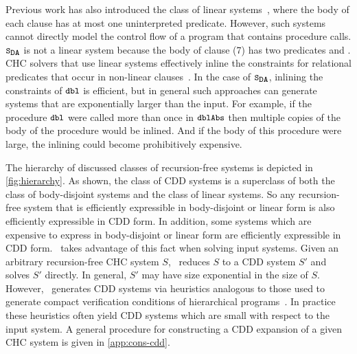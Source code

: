 Previous work has also introduced the class of linear
systems~\cite{albarghouthi12a}, where the body of each clause has at
most one uninterpreted predicate.
%
However, such systems cannot directly model the control flow of a
program that contains procedure calls.
%
$\mcchc$ is not a linear system because the body of clause (7) has two
predicates  and .
%
CHC solvers that use linear systems effectively inline the
constraints for relational predicates that occur in non-linear
clauses~\cite{albarghouthi12b}.
%
In the case of $\mcchc$, inlining the constraints of $\cc{dbl}$ is
efficient, but in general such approaches can generate systems that
are exponentially larger than the input. For example, if the procedure
$\cc{dbl}$ were called more than once in $\cc{dblAbs}$ then multiple
copies of the body of the procedure would be inlined. And if the body
of this procedure were large, the inlining could become
prohibitively expensive.

\begin{figure}[t]
  \centering
  \begin{floatrow}[2]
      {}
      {}
  \end{floatrow}
\end{figure}

The hierarchy of discussed classes of recursion-free systems is
depicted in \autoref{fig:hierarchy}.
%
As shown, the class of CDD systems is a superclass of both the class
of body-disjoint systems and the class of linear systems. So any
recursion-free system that is efficiently expressible in body-disjoint
or linear form is also efficiently expressible in CDD form.
%
In addition, some systems which are expensive to express in
body-disjoint or linear form are efficiently expressible in CDD form.
%
\sys~takes advantage of this fact when solving input systems.
Given an arbitrary recursion-free CHC system $S$, \sys~reduces $S$ to
a CDD system $S'$ and solves $S'$ directly.
%
In general, $S'$ may have size exponential in the size of
$S$.
%
However, \sys~generates CDD systems via heuristics analogous to
those used to generate compact verification conditions of hierarchical
programs~\cite{flanagan01,lal-qadeer15}.
%
In practice these heuristics often yield CDD systems which are
small with respect to the input system.
%
A general procedure for constructing a CDD expansion of a given CHC
system is given in \autoref{app:cons-cdd}.
